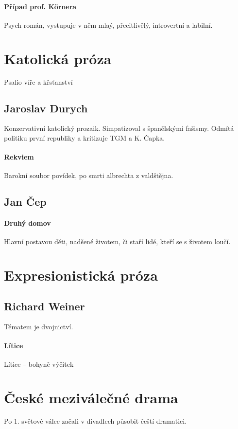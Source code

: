 \documentclass[10pt,a4page,headings,openany,%
oneside
,twocolumn
]{report}
\begin{document}
\paragraph{Případ prof. Körnera} Psych román, vystupuje v něm mlaý, přecitlivělý, introvertní a labilní.

\section{Katolická próza} Psalio víře a křsťanství

\subsection{Jaroslav Durych} Konzervativní katolický prozaik. Simpatizoval s španělskými fašismy. Odmítá politiku první republiky a kritizuje TGM a K. Čapka.

\paragraph{Rekviem} Barokní soubor povídek, po smrti albrechta z valdštějna.

\subsection{Jan Čep}

\paragraph{Druhý domov}Hlavní postavou děti, nadšené životem, či staří lidé, kteří se s životem loučí.

\section{Expresionistická próza}

\subsection{Richard Weiner}

Tématem je dvojnictví.	

\paragraph{Lítice} Lítice -- bohyně výčitek

\section{České meziválečné drama}
Po 1. světové válce začali v divadlech působit čeští dramatici. 
\end{document}
